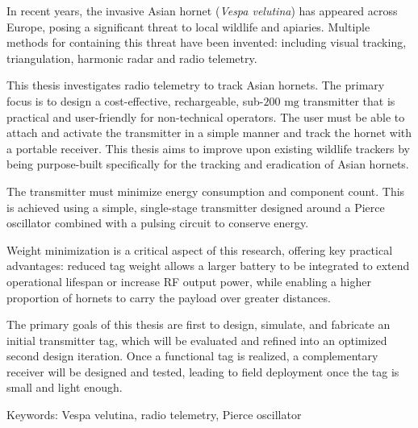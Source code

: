 In recent years, the invasive Asian hornet (\textit{Vespa velutina}) has appeared across Europe, posing a significant threat to local wildlife and apiaries. Multiple methods for containing this threat have been invented: including visual tracking, triangulation, harmonic radar and radio telemetry.

This thesis investigates radio telemetry to track Asian hornets. The primary focus is to design a cost-effective, rechargeable, sub-$200\text{ mg}$ transmitter that is practical and user-friendly for non-technical operators. The user must be able to attach and activate the transmitter in a simple manner and track the hornet with a portable receiver. This thesis aims to improve upon existing wildlife trackers by being purpose-built specifically for the tracking and eradication of Asian hornets.

The transmitter must minimize energy consumption and component count. This is achieved using a simple, single-stage transmitter designed around a Pierce oscillator combined with a pulsing circuit to conserve energy.

Weight minimization is a critical aspect of this research, offering key practical advantages: reduced tag weight allows a larger battery to be integrated to extend operational lifespan or increase RF output power, while enabling a higher proportion of hornets to carry the payload over greater distances.

The primary goals of this thesis are first to design, simulate, and fabricate an initial transmitter tag, which will be evaluated and refined into an optimized second design iteration. Once a functional tag is realized, a complementary receiver will be designed and tested, leading to field deployment once the tag is small and light enough.





Keywords: Vespa velutina, radio telemetry, Pierce oscillator %
